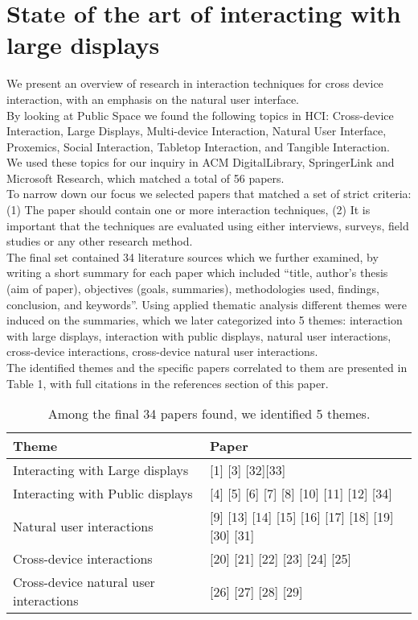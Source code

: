 \section{State of the art of interacting with large displays}
We present an overview of research in interaction techniques for cross device interaction, with an emphasis on the natural user interface.\\
By looking at Public Space we found the following topics in HCI: Cross-device Interaction, Large Displays, Multi-device Interaction, Natural User Interface, Proxemics, Social Interaction, Tabletop Interaction, and Tangible Interaction. \\
We used these topics for our inquiry in ACM DigitalLibrary, SpringerLink and Microsoft Research, which matched a total of 56 papers. \\
To narrow down our focus we selected papers that matched a set of strict criteria: (1) The paper should contain one or more interaction techniques, (2) It is important that the techniques are evaluated using either interviews, surveys, field studies or any other research method.\\
The final set contained 34 literature sources which we further examined, by writing a short summary for each paper which included ``title, author's thesis (aim of paper), objectives (goals, summaries), methodologies used, findings, conclusion, and keywords''. 
Using applied thematic analysis different themes were induced on the summaries, which we later categorized into 5 themes: interaction with large displays, interaction with public displays, natural user interactions, cross-device interactions, cross-device natural user interactions.\\
The identified themes and the specific papers correlated to them are presented in Table 1, with full citations in the references section of this paper. 


\begin{table*}[t]
\centering
\begin{tabular}{@{}ll@{}}
\toprule
Theme & Paper \\ \midrule
Interacting with Large displays      &      [1] [3] [32][33] \\
Interacting with Public displays      &       [4] [5] [6] [7] [8] [10] [11] [12] [34] \\
Natural user interactions      &      [9] [13] [14] [15] [16] [17] [18] [19] [30] [31] \\
Cross-device interactions      &      [20] [21] [22] [23] [24] [25] \\
Cross-device natural user interactions      &      [26] [27] [28] [29] \\ \bottomrule
\end{tabular}
\caption{Among the final 34 papers found, we identified 5 themes.}
\label{table:themes}
\end{table*}






